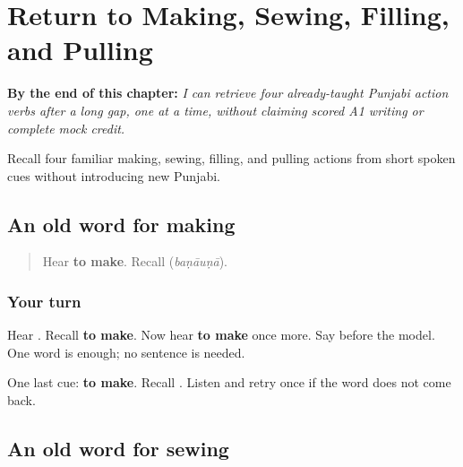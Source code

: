 
\chapter{Return to Making, Sewing, Filling, and Pulling}
\label{ch:pa-four-more-familiar-actions-r4}

\begin{chapteropening}
\textbf{By the end of this chapter:} \emph{I can retrieve four already-taught Punjabi action verbs after a long gap, one at a time, without claiming scored A1 writing or complete mock credit.}

Recall four familiar making, sewing, filling, and pulling actions from short spoken cues without introducing new Punjabi.
\end{chapteropening}

\section[\texorpdfstring{\pa{ਬਣਾਉਣਾ} (baṇāuṇā)}{ਬਣਾਉਣਾ (baṇāuṇā)}]{An old word for making}

\label{lesson:PA-R163-make-again}



\begin{quote}
Hear \textbf{to make}. Recall \textbf{} (\emph{baṇāuṇā}).
\end{quote}

\subsection*{Your turn}
Hear \textbf{}. Recall \textbf{to make}. Now hear \textbf{to make} once more. Say \textbf{} before the model. One word is enough; no sentence is needed.

\begin{tcolorbox}[breakable,colback=teal!4,colframe=teal!35!black,title={Before you move on}]
One last cue: \textbf{to make}. Recall \textbf{}. Listen and retry once if the word does not come back.
\end{tcolorbox}
\section[\texorpdfstring{\pa{ਸਿਉਣਾ} (siuṇā)}{ਸਿਉਣਾ (siuṇā)}]{An old word for sewing}

